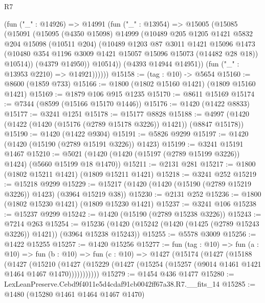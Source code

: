 \begin{lexlean}{R7}
\begin{coremodule}
            (fun ("_" : @14926) =>
            @14991
              (fun ("_" : @13954) =>
              @15005
                (@15085
                  (@15091
                    (@15095
                      (@4350 @15098)
                      @14999
                      (@10489
                        @205
                        @1205
                        @1421
                        @5832
                        @204
                        @15098
                        (@10511 @204)
                        (@10489
                          @1203
                          @87
                          @3011
                          @1421
                          @15096
                          @1473
                          (@10480 @354 @1196 @3009 @1421 @15057 @15096 @15073 (@14482 @28 @18))
                          @10514))
                      (@4379 @14950))
                    @10514))
                (@4393 @14944 @14951))
              (fun ("_" : @13953 @2210) => @14921))))))
@15158 := (tag : @10) -> @5654
@15160 := @8600 (@1859 @733)
@15166 := @1800 (@1802 @15160 @1421) (@1809 @15160 @1421)
@15169 := @1879 @106 @915 @1235
@15170 := @8611 @15169
@15174 := @7344 (@8599 (@15166 @15170 @1446))
@15176 := @1420 (@1422 @8833)
@15177 := @3241 @1251
@15178 := @15177 @8828
@15188 := @4997 (@1420 (@1422 (@1420 (@15176 (@2789 @15178 @3226)) @1421)) (@8847 @15178))
@15190 := @1420 (@1422 @9304)
@15191 := @5826 @9299
@15197 := @1420 (@1420 (@15190 (@2789 @15191 @3226)) @1423)
@15199 := @3241 @15191 @1467
@15210 := @5021 (@1420 (@1420 (@15197 (@2789 @15199 @3226)) @1424) (@5660 @15199 @18 @1470))
@15211 := @2131 @281
@15217 := @1800 (@1802 @15211 @1421) (@1809 @15211 @1421)
@15218 := @3241 @252
@15219 := @15218 @9299
@15229 := @15217 (@1420 (@1420 (@15190 (@2789 @15219 @3226)) @1423) (@3964 @15219 @38))
@15230 := @2131 @252
@15236 := @1800 (@1802 @15230 @1421) (@1809 @15230 @1421)
@15237 := @3241 @106
@15238 := @15237 @9299
@15242 := @1420 (@15190 (@2789 @15238 @3226))
@15243 := @7214 @263
@15254 := @15236 (@1420 (@15242 (@1420 (@1425 (@2789 @15243 @3226)) @1421)) (@3964 @15238 @15243))
@15255 := @5578 @3009
@15256 := @1422 @15255
@15257 := @1420 @15256
@15277 := fun (tag : @10) =>
  fun (a : @10) =>
  fun (b : @10) =>
  fun (c : @10) =>
  @1427
    (@15174
      (@1427
        (@15188
          (@1427
            (@15210
              (@1427 (@15229 (@1427 (@15254 (@15257 (@9014 @1461 @1421 @1464 @1467 @1470)))))))))))
@15279 := @1454 @436 @1477
@15280 := LexLeanPreserve.Cebd9f4011e5d4cdaf91cb0042ff67a38.R7.__fits_14
@15285 := @1480 (@15280 @1461 @1464 @1467 @1470)

\end{coremodule}
\end{lexlean}
